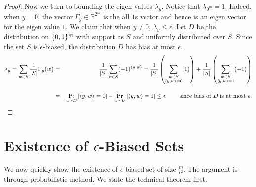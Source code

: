 \begin{proof}
Now we turn to bounding the eigen values $\lambda_y$. Notice that $\lambda_{0^m} = 1$. Indeed, when $y=0$, the vector $\Gamma_y \in \mathbb{R}^{2^m}$ is the all $1$s vector and hence is an eigen vector for the eigen value $1$. We claim that when $y \ne 0$, $\lambda_y \le \epsilon$. Let $D$ be the distribution on $\{0,1\}^m$ with support as $S$ and uniformly distributed over $S$. Since the set $S$ is $\epsilon$-biased, the distribution $D$ has bias at most $\epsilon$.
\begin{eqnarray*}
\lambda_y = \sum_{w \in S} \frac{1}{|S|} \Gamma_y(w) & = &  \frac{1}{|S|} \sum_{w \in S} (-1)^{\langle y, w \rangle} = \frac{1}{|S|} \left(\sum_{\substack{w \in S \\\langle y, w \rangle = 0}} (1) \right) + \frac{1}{|S|} \left(\sum_{\substack{w \in S \\\langle y, w \rangle = 1}} (-1)\right)\\[4mm]
& = & \Pr_{w \sim D} \left[ \langle y, w \rangle = 0 \right] - \Pr_{w \sim D} \left[ \langle y, w \rangle = 1 \right] \le \epsilon \textrm{\hspace{7mm} since bias of $D$ is at most $\epsilon$.}
\end{eqnarray*}

\end{proof}

\section{Existence of $\epsilon$-Biased Sets}

We now quickly show the existence of $\epsilon$ biased set of size $\frac{m}{\epsilon^2}$. The argument is through probabilistic method. We state the technical theorem first.

